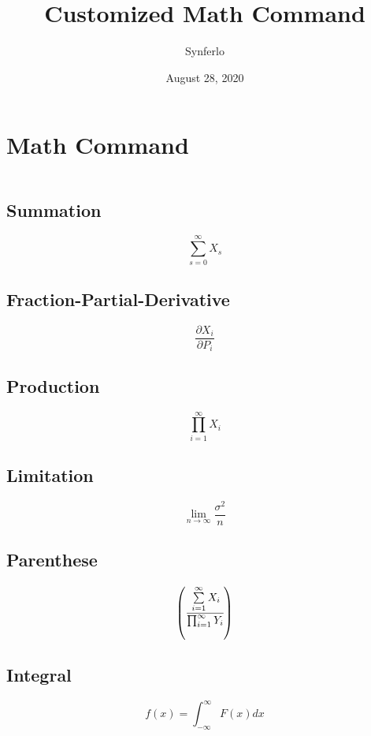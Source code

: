 \documentclass[12pt]{article}
\title{Customized Math Command}
\author{Synferlo}
\date{August 28, 2020}
\newcommand{\infinity}{\infty}
\newcommand{\fp}[2]{\frac{\partial{#1}}{\partial{#2}}}
\newcommand{\addup}[4]{\sum\limits_{#1 = #2} ^#3 {#4}}
\newcommand{\pai}[4]{\prod_{#1 = #2} ^#3 {#4}}
\newcommand{\Lim}[3]{\lim_{#1 \to #2} {#3}}
\newcommand{\bkt}[1]{\left( {#1} \right)}
\newcommand{\integral}[3]{\int_{#1}^{#2}{#3}}
\begin{document}
    \maketitle
    \newpage

    \section{Math Command}
    $$$$

        \subsection{Summation}
            $$ \addup{s}{0}{\infinity}{X_s} $$


        \subsection{Fraction-Partial-Derivative}
            $$ \fp{X_i}{P_i} $$

        
        \subsection{Production}
            $$ \pai{i}{1}{\infinity}{X_i} $$


        \subsection{Limitation}
            $$ \Lim{n}{\infinity}{\frac{\sigma^2}{n}} $$


        \subsection{Parenthese}
            $$ \bkt{\cfrac{\addup{i}{1}{\infinity}{X_i}}{\pai{i}{1}{\infinity}{Y_i}}}$$


        \subsection{Integral}
            $$ f(x) = \integral{-\infinity}{\infinity}{F(x)}dx $$
\end{document}
